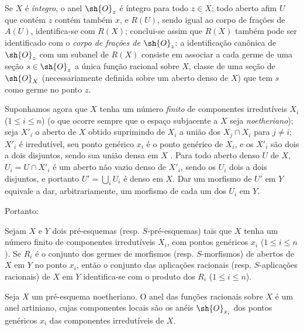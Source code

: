 \documentclass[oneside]{amsart}
\renewcommand{\leq}{\leqslant}
\newcommand{\oldpage}[2][]{{\marginnote{\normalfont\textbf{#1}~|~#2}}\ignorespaces}
\let\EGAOriginalLabel\label
\renewcommand{\label}[1]{\phantomsection\EGAOriginalLabel{#1}}
\begin{document}
Se $X$ é \emph{íntegro}, o anel $\sh{O}_z$ é íntegro para todo $z\in X$; todo aberto afim $U$ que contém $z$ contém também $x$, e $R(U)$, sendo igual ao corpo de frações de $A(U)$, identifica-se com $R(X)$; conclui-se assim que $R(X)$ também pode ser identificado com o \emph{corpo de frações de $\sh{O}_z$}: a identificação canônica de $\sh{O}_z$ com um subanel de $R(X)$ consiste em associar a cada germe de uma seção $s\in\sh{O}_z$ a única função racional sobre $X$, classe de uma seção de $\sh{O}_X$ (necessariamente definida sobre um aberto denso de $X$) que tem $s$ como germe no ponto $z$.

\begin{env}[7.1.6]
\label{I.7.1.6}
Suponhamos agora que $X$ tenha um número \emph{finito} de componentes irredutíveis $X_i$ ($1\leq i\leq n$) (o que ocorre sempre que o espaço subjacente a $X$ seja \emph{noetheriano}); seja $X'_i$ o aberto de $X$ obtido suprimindo de $X_i$ a união dos $X_j\cap X_i$ para $j\neq i$; $X'_i$ é irredutível, seu ponto genérico $x_i$ é o ponto genérico de $X_i$, e os $X'_i$ são dois a dois disjuntos, sendo sua união densa em $X$ .
Para
\oldpage[I]{157}
todo aberto denso $U$ de $X$, $U_i=U\cap X'_i$ é um aberto não vazio denso de $X'_i$, sendo os $U_i$ dois a dois disjuntos, e portanto $U'=\bigcup_i U_i$ é denso em $X$.
Dar um morfismo de $U'$ em $Y$ equivale a dar, arbitrariamente, um morfismo de cada um dos $U_i$ em $Y$.
\end{env}

Portanto:

\begin{proposition}[7.1.7]
\label{I.7.1.7}
Sejam $X$ e $Y$ dois pré-esquemas (resp. $S$-pré-esquemas) tais que $X$ tenha um número finito de componentes irredutíveis $X_i$, com pontos genéricos $x_i$ ($1\leq i\leq n$).
Se $R_i$ é o conjunto dos germes de morfismos (resp. $S$-morfismos) de abertos de $X$ em $Y$ no ponto $x_i$, então o conjunto das aplicações racionais (resp. $S$-aplicações racionais) de $X$ em $Y$ identifica-se com o produto dos $R_i$ ($1\leq i\leq n$).
\end{proposition}

\begin{corollary}[7.1.8]
\label{I.7.1.8}
Seja $X$ um pré-esquema noetheriano.
O anel das funções racionais sobre $X$ é um anel artiniano, cujas componentes locais são os anéis $\sh{O}_{x_i}$ dos pontos genéricos $x_i$ das componentes irredutíveis de $X$.
\end{corollary}
\end{document}
